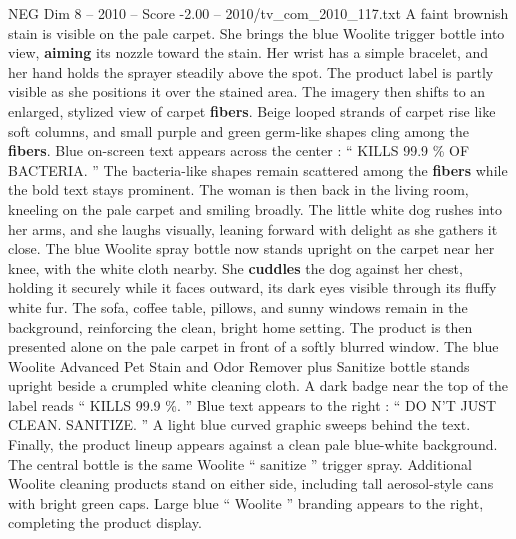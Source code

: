 \begin{textsample}{NEG Dim 8 – 2010 – Score -2.00 – 2010/tv\_com\_2010\_117.txt}
A faint brownish stain is visible on the pale carpet.
She brings the blue Woolite trigger bottle into view, \textbf{aiming} its nozzle toward the stain.
Her wrist has a simple bracelet, and her hand holds the sprayer steadily above the spot.
The product label is partly visible as she positions it over the stained area.
The imagery then shifts to an enlarged, stylized view of carpet \textbf{fibers}.
Beige looped strands of carpet rise like soft columns, and small purple and green germ-like shapes cling among the \textbf{fibers}.
Blue on-screen text appears across the center : “ KILLS 99.9 \% OF BACTERIA. ” The bacteria-like shapes remain scattered among the \textbf{fibers} while the bold text stays prominent.
The woman is then back in the living room, kneeling on the pale carpet and smiling broadly.
The little white dog rushes into her arms, and she laughs visually, leaning forward with delight as she gathers it close.
The blue Woolite spray bottle now stands upright on the carpet near her knee, with the white cloth nearby.
She \textbf{cuddles} the dog against her chest, holding it securely while it faces outward, its dark eyes visible through its fluffy white fur.
The sofa, coffee table, pillows, and sunny windows remain in the background, reinforcing the clean, bright home setting.
The product is then presented alone on the pale carpet in front of a softly blurred window.
The blue Woolite Advanced Pet Stain and Odor Remover plus Sanitize bottle stands upright beside a crumpled white cleaning cloth.
A dark badge near the top of the label reads “ KILLS 99.9 \%. ” Blue text appears to the right : “ DO N’T JUST CLEAN.
SANITIZE. ” A light blue curved graphic sweeps behind the text.
Finally, the product lineup appears against a clean pale blue-white background.
The central bottle is the same Woolite “ sanitize ” trigger spray.
Additional Woolite cleaning products stand on either side, including tall aerosol-style cans with bright green caps.
Large blue “ Woolite ” branding appears to the right, completing the product display.

\end{textsample}
